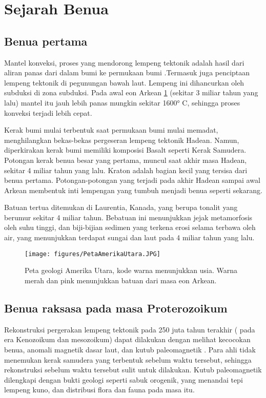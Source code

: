 
\section{Sejarah Benua}

\subsection{Benua pertama}
Mantel konveksi, proses yang mendorong lempeng tektonik adalah hasil dari aliran panas dari dalam bumi ke permukaan bumi \cite{suryasejarah}.Termasuk juga penciptaan lempeng tektonik di pegunungan bawah laut. Lempeng ini dihancurkan oleh subduksi di zona subduksi. Pada awal eon Arkean \ref{Peta Amerika Utara} (sekitar 3 miliar tahun yang lalu) mantel itu jauh lebih panas mungkin sekitar 1600° C, sehingga proses konveksi terjadi lebih cepat.

Kerak bumi mulai terbentuk saat permukaan bumi mulai memadat, menghilangkan bekas-bekas pergeseran lempeng tektonik Hadean. Namun, diperkirakan kerak bumi memiliki komposisi Basalt seperti Kerak Samudera. Potongan kerak benua besar yang pertama, muncul saat akhir masa Hadean, sekitar 4 miliar tahun yang lalu. Kraton adalah bagian kecil yang tersisa dari benua pertama. Potongan-potongan yang terjadi pada akhir Hadean sampai awal Arkean membentuk inti lempengan yang tumbuh menjadi benua seperti sekarang.

Batuan tertua ditemukan di Laurentia, Kanada, yang berupa tonalit yang berumur sekitar 4 miliar tahun. Bebatuan ini menunjukkan jejak metamorfosis oleh suhu tinggi,  dan biji-bijian sedimen yang terkena erosi selama terbawa oleh air, yang menunjukkan terdapat sungai dan laut pada 4 miliar tahun yang lalu.

\begin{figure}[ht]
    \centerline{\texttt{[image: figures/PetaAmerikaUtara.JPG]}}
    \caption{Peta geologi Amerika Utara, kode warna menunjukkan usia. Warna merah dan pink menunjukkan batuan dari masa eon Arkean.}
    \label{Peta Amerika Utara}
    \end{figure}


\subsection{Benua raksasa pada masa Proterozoikum} 
Rekonstruksi pergerakan lempeng tektonik pada 250 juta tahun terakhir ( pada era Kenozoikum dan mesozoikum) dapat dilakukan dengan melihat kecocokan benua, anomali magnetik dasar laut, dan kutub paleomagnetik \cite{suryasejarah}. Para ahli tidak menemukan kerak samudera yang terbentuk sebelum waktu tersebut, sehingga rekonstruksi sebelum waktu tersebut sulit untuk dilakukan. Kutub paleomagnetik dilengkapi dengan bukti geologi seperti sabuk orogenik, yang menandai tepi lempeng kuno, dan distribusi flora dan fauna pada masa itu.

